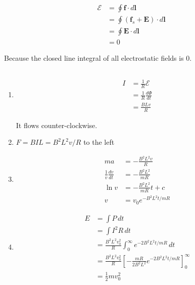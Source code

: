 \documentclass{article}
\renewcommand{\vec}[1]{\boldsymbol{\mathbf{#1}}}
\begin{document}
\subsection{}

\begin{align*}
  \mathcal{E} & = \oint \vec{f} \cdot d \vec{l}               \\
              & = \oint (\vec{f}_s + \vec{E}) \cdot d \vec{l} \\
              & = \oint \vec{E} \cdot d \vec{l}               \\
              & = 0
\end{align*}

Because the closed line integral of all electrostatic fields is $0$.

\subsection{}

\begin{enumerate}
  \item

        \begin{align*}
          I & = \frac{1}{R} \mathcal{E}        \\
            & = \frac{1}{R} \frac{d \Phi}{d t} \\
            & = \frac{B L v}{R}
        \end{align*}

        It flows counter-clockwise.

  \item $F = B I L = B^2 L^2 v / R$ to the left

  \item

        \begin{align*}
          m a                         & = -\frac{B^2 L^2 v}{R}       \\
          \frac{1}{v} \frac{d v}{d t} & = -\frac{B^2 L^2}{m R}       \\
          \ln v                       & = -\frac{B^2 L^2}{m R} t + c \\
          v                           & = v_0 e^{-B^2 L^2 t / m R}
        \end{align*}

  \item

        \begin{align*}
          E & = \int P \,d t                                                                                  \\
            & = \int I^2 R \,d t                                                                              \\
            & = \frac{B^2 L^2 v_0^2}{R} \int_0^\infty e^{-2 B^2 L^2 t / m R} \,d t                            \\
            & = \frac{B^2 L^2 v_0^2}{R} \left[ -\frac{m R}{2 B^2 L^2} e^{-2 B^2 L^2 t / m R} \right]_0^\infty \\
            & = \frac{1}{2} m v_0^2
        \end{align*}
\end{enumerate}
\end{document}
